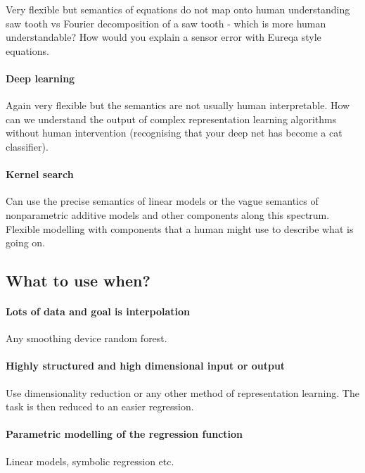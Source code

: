 \documentclass[twoside]{article}
\begin{document}
Very flexible but semantics of equations do not map onto human understanding \eg saw tooth vs Fourier decomposition of a saw tooth - which is more human understandable?
How would you explain a sensor error with Eureqa style equations.

\paragraph{Deep learning}

Again very flexible but the semantics are not usually human interpretable.
How can we understand the output of complex representation learning algorithms without human intervention (\eg recognising that your deep net has become a cat classifier).

\paragraph{Kernel search}

Can use the precise semantics of linear models or the vague semantics of nonparametric additive models and other components along this spectrum.
Flexible modelling with components that a human might use to describe what is going on.

\subsection{What to use when?}

\paragraph{Lots of data and goal is interpolation}

Any smoothing device \eg random forest.

\paragraph{Highly structured and high dimensional input or output}

Use dimensionality reduction or any other method of representation learning.
The task is then reduced to an easier regression.

\paragraph{Parametric modelling of the regression function}

Linear models, symbolic regression etc.
\end{document}
